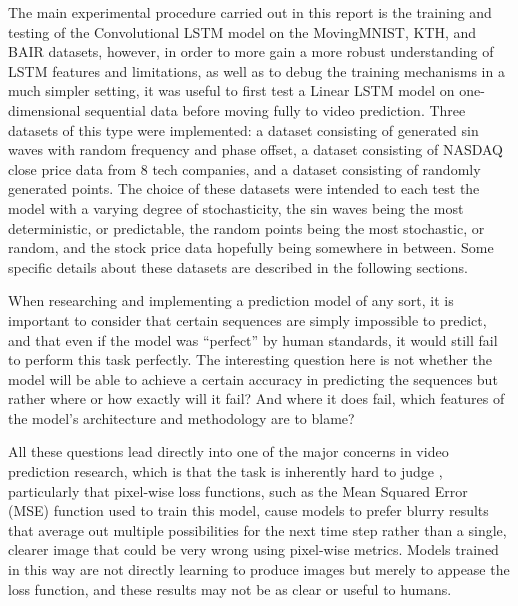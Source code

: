\documentclass{scrartcl}
\begin{document}
The main experimental procedure carried out in this report is the training and
testing of the Convolutional LSTM model on the MovingMNIST, KTH, and BAIR
datasets, however, in order to more gain a more robust understanding of LSTM
features and limitations, as well as to debug the training mechanisms in a much
simpler setting, it was useful to first test a Linear LSTM model on
one-dimensional sequential data before moving fully to video prediction. Three
datasets of this type were implemented: a dataset consisting of generated sin
waves with random frequency and phase offset, a dataset consisting of NASDAQ
close price data from 8 tech companies, and a dataset consisting of randomly
generated points. The choice of these datasets were intended to each test the
model with a varying degree of stochasticity, the sin waves being the most
deterministic, or predictable, the random points being the most stochastic, or
random, and the stock price data hopefully being somewhere in between. Some
specific details about these datasets are described in the following sections.

When researching and implementing a prediction model of any sort, it is
important to consider that certain sequences are simply impossible to predict,
and that even if the model was ``perfect'' by human standards, it would still
fail to perform this task perfectly. The interesting question here is not
whether the model will be able to achieve a certain accuracy in predicting the
sequences but rather where or how exactly will it fail? And where it does fail,
which features of the model's architecture and methodology are to blame?

All these questions lead directly into one of the major concerns in video
prediction research, which is that the task is inherently hard to judge
\cite{video_prediction_survey}, particularly that pixel-wise loss functions,
such as the Mean Squared Error (MSE) function used to train this model, cause
models to prefer blurry results that average out multiple possibilities for the
next time step rather than a single, clearer image that could be very wrong
using pixel-wise metrics. Models trained in this way are not directly learning
to produce images but merely to appease the loss function, and these results
may not be as clear or useful to humans.

\end{document}
